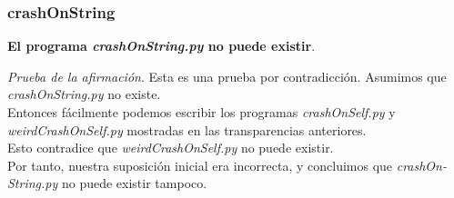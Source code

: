 \documentclass[xcolor=table]{beamer}
\begin{document}
\begin{frame}  [fragile] \frametitle{crashOnString} \footnotesize 

\textbf{El programa\textit{ crashOnString.py} no puede existir}. \\\newline


\textit{Prueba de la afirmación}. Esta es una prueba por contradicción. Asumimos que \textit{crashOnString.py} no existe. \\

Entonces fácilmente podemos escribir los programas \textit{crashOnSelf.py}
y \textit{weirdCrashOnSelf.py} mostradas en las transparencias anteriores.\\ 

Esto contradice que \textit{weirdCrashOnSelf.py} no puede existir. \\


Por tanto, nuestra suposición inicial era incorrecta, y concluimos que \textit{crashOn-String.py} no puede existir tampoco.

\end{frame} 







\backmatter
\end{document}
